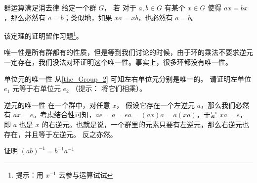 \begin{theorem}{群运算满足消去律}\label{the_Group_2}
给定一个群 $G$， 若 对于 $ a, b\in G$ 有某个 $x\in G$ 使得 $ax=bx$，那么必然有 $a=b$；类似地，如果 $xa=xb$，也必然有 $a=b$。
\end{theorem}

该定理的证明留作习题\footnote{提示：用 $x^{-1}$ 去参与运算试试}。

唯一性是所有群都有的性质，但是等到我们讨论的时候，由于环的乘法不要求逆元一定存在，我们没法对环证明这个唯一性。事实上，很多环都没有唯一性。

\begin{exercise}{单位元的唯一性}
从\autoref{the_Group_2} 可知左右单位元分别是唯一的。 请证明左单位 $e_1$ 元等于右单位元 $e_2$ （提示： 将它们相乘）。
\end{exercise}

\begin{theorem}{逆元的唯一性}\label{the_Group_1}
在一个群中，对任意 $x$， 假设它存在一个左逆元 $a$，那么我们必然有 $ax=e$。考虑结合性可知，$ae=a=ea=(ax)a=a(xa)$，于是 $xa=e$，即 $a$ 也是 $x$ 的右逆元。也就是说，一个群里的元素只要有左逆元，那么右逆元也存在，并且等于左逆元。 反之亦然。
\end{theorem}

\begin{exercise}{}
证明 $(ab)^{-1} = b^{-1}a^{-1}$
\end{exercise}
